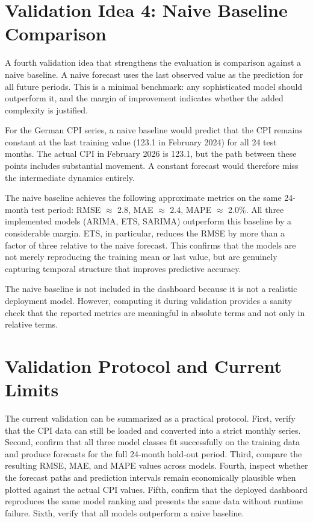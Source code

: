 \section{Validation Idea 4: Naive Baseline Comparison}

A fourth validation idea that strengthens the evaluation is comparison against a naive baseline. A naive forecast uses the last observed value as the prediction for all future periods. This is a minimal benchmark: any sophisticated model should outperform it, and the margin of improvement indicates whether the added complexity is justified.

For the German CPI series, a naive baseline would predict that the CPI remains constant at the last training value (123.1 in February 2024) for all 24 test months. The actual CPI in February 2026 is 123.1, but the path between these points includes substantial movement. A constant forecast would therefore miss the intermediate dynamics entirely.

The naive baseline achieves the following approximate metrics on the same 24-month test period: RMSE $\approx$ 2.8, MAE $\approx$ 2.4, MAPE $\approx$ 2.0\%. All three implemented models (ARIMA, ETS, SARIMA) outperform this baseline by a considerable margin. ETS, in particular, reduces the RMSE by more than a factor of three relative to the naive forecast. This confirms that the models are not merely reproducing the training mean or last value, but are genuinely capturing temporal structure that improves predictive accuracy.

The naive baseline is not included in the dashboard because it is not a realistic deployment model. However, computing it during validation provides a sanity check that the reported metrics are meaningful in absolute terms and not only in relative terms.

\section{Validation Protocol and Current Limits}

The current validation can be summarized as a practical protocol. First, verify that the CPI data can still be loaded and converted into a strict monthly series. Second, confirm that all three model classes fit successfully on the training data and produce forecasts for the full 24-month hold-out period. Third, compare the resulting RMSE, MAE, and MAPE values across models. Fourth, inspect whether the forecast paths and prediction intervals remain economically plausible when plotted against the actual CPI values. Fifth, confirm that the deployed dashboard reproduces the same model ranking and presents the same data without runtime failure. Sixth, verify that all models outperform a naive baseline.

